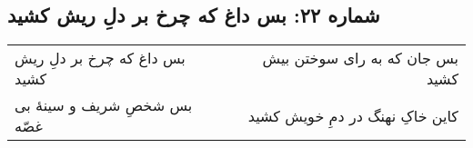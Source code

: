 \begin{center}
\section*{شماره ۲۲: بس داغ که چرخ بر دلِ ریش کشید}
\label{sec:022}
\begin{longtable}{l p{0.5cm} r}
بس داغ که چرخ بر دلِ ریش کشید
&&
بس جان که به رای سوختن بیش کشید
\\
بس شخصِ شریف و سینهٔ بی غصّه
&&
کاین خاکِ نهنگ در دمِ خویش کشید
\\
\end{longtable}
\end{center}
